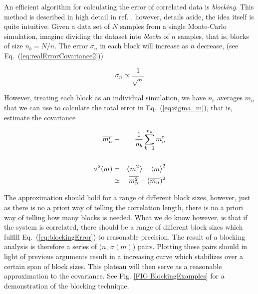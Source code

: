 An efficient algorithm for calculating the error of correlated data is \textit{blocking}. This method is described in high detail in ref. \cite{flyvbjerg:461}, however, details aside, the idea itself is quite intuitive: Given a data set of $N$ samples from a single Monte-Carlo simulation, imagine dividing the dataset into \textit{blocks} of $n$ samples, that is, blocks of size  $n_b=N/n$. The error $\sigma_n$ in each block will increase as $n$ decrease, (see Eq.~(\ref{eq:realErrorCovariance2}))

\begin{equation}
 \sigma_n \propto \frac{1}{\sqrt{n}}
\end{equation}


However, treating each block as an individual simulation, we have $n_b$ averages $m_n$ that we can use to calculate the total error in Eq.~(\ref{eq:sigma_m}), that is, estimate the covariance

\begin{eqnarray}
  \overline{m_n^r} &\equiv& \frac{1}{n_b}\sum_{k=1}^{n_b} m_n^r \\
\nonumber\\
  \sigma^2(m) &=& \left< m^2 \right> - \left< m \right>^2 \nonumber\\
              &\simeq& \overline{m_n^2} - (\overline{m_n})^2 \label{eq:blockingError}
\end{eqnarray}

The approximation should hold for a range of different block sizes, however, just as there is no a priori way of telling the correlation length, there is no a priori way of telling how many blocks is needed. What we do know however, is that if the system is correlated, there should be a range of different block sizes which fulfill Eq.~(\ref{eq:blockingError}) to reasonable precision. The result of a blocking analysis is therefore a series of ($n$, $\sigma(m)$) pairs. Plotting these pairs should in light of previous arguments result in a increasing curve which stabilizes over a certain span of block sizes. This plateau will then serve as a reasonable approximation to the covariance. See Fig. \ref{FIG:BlockingExamples} for a demonstration of the blocking technique.


